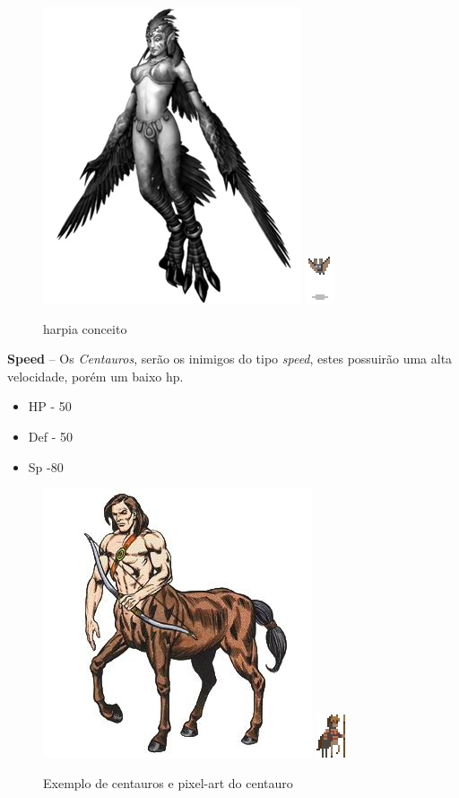 \documentclass[11pt]{article} %
\begin{document}
\begin{figure}[!htp]
\centering
\includegraphics[scale=0.75]{res/characters/harpia.png} \quad
\includegraphics[scale=2]{res/characters/bat.png} 
\caption{harpia conceito}
\label{cyclops}
\end{figure}

\textbf{{\large Speed}} – Os \textit{Centauros}, serão os inimigos do tipo \textit{speed}, estes possuirão uma alta velocidade, porém um baixo hp.
\begin{itemize}
\item HP - 50
\item Def - 50
\item Sp -80
\end{itemize}

\begin{figure}[!htp]
\centering
\includegraphics[scale=0.4]{res/characters/centauro.jpg} \quad
\includegraphics[scale=3]{res/characters/centauro.png} 
\caption{Exemplo de centauros e pixel-art do centauro}
\label{cyclops}
\end{figure}
\end{document}
